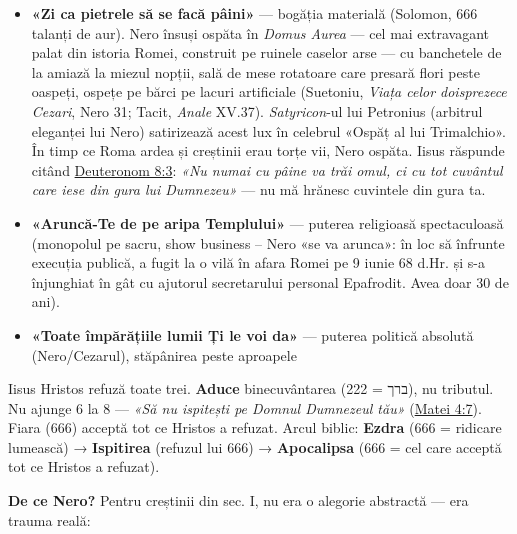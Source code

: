 \documentclass[12pt,a4paper,twoside,openany]{book}
\begin{document}
\begin{itemize}
  \item \textbf{«Zi ca pietrele să se facă pâini»} — bogăția materială (Solomon, 666 talanți de aur). Nero însuși ospăta în \textit{Domus Aurea} — cel mai extravagant palat din istoria Romei, construit pe ruinele caselor arse — cu banchetele de la amiază la miezul nopții, sală de mese rotatoare care presară flori peste oaspeți, ospețe pe bărci pe lacuri artificiale (Suetoniu, \textit{Viața celor doisprezece Cezari}, Nero 31; Tacit, \textit{Anale} XV.37). \textit{Satyricon}-ul lui Petronius (arbitrul eleganței lui Nero) satirizează acest lux în celebrul «Ospăț al lui Trimalchio». În timp ce Roma ardea și creștinii erau torțe vii, Nero ospăta. Iisus răspunde citând \href{https://bibliaortodoxa.ro/carte.php?id=17\&cap=8\#3}{Deuteronom 8:3}: \textit{«Nu numai cu pâine va trăi omul, ci cu tot cuvântul care iese din gura lui Dumnezeu»} — nu mă hrănesc cuvintele din gura ta.
  \item \textbf{«Aruncă-Te de pe aripa Templului»} — puterea religioasă spectaculoasă (monopolul pe sacru, show business -- Nero «se va arunca»: în loc să înfrunte execuția publică, a fugit la o vilă în afara Romei pe 9 iunie 68 d.Hr. și s-a înjunghiat în gât cu ajutorul secretarului personal Epafrodit. Avea doar 30 de ani).
  \item \textbf{«Toate împărățiile lumii Ți le voi da»} — puterea politică absolută (Nero/Cezarul), stăpânirea peste aproapele
\end{itemize}
Iisus Hristos refuză toate trei. \textbf{Aduce} binecuvântarea (ברך = 222), nu tributul. Nu ajunge 6 la 8 — \textit{«Să nu ispitești pe Domnul Dumnezeul tău»} (\href{https://bibliaortodoxa.ro/carte.php?id=55\&cap=4\#7}{Matei 4:7}). Fiara (666) acceptă tot ce Hristos a refuzat. Arcul biblic: \textbf{Ezdra} (666 = ridicare lumească) → \textbf{Ispitirea} (refuzul lui 666) → \textbf{Apocalipsa} (666 = cel care acceptă tot ce Hristos a refuzat).

\textbf{De ce Nero?} Pentru creștinii din sec. I, nu era o alegorie abstractă — era trauma reală:
\end{document}
